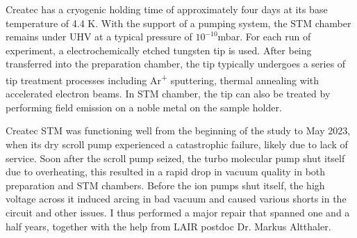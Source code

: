 Createc has a cryogenic holding time of approximately four days at its base temperature of 4.4 K. With the support of a pumping system, the STM chamber remains under UHV at a typical pressure of $10^{-10}$mbar. For each run of experiment, a electrochemically etched tungsten tip is used. After being transferred into the preparation chamber, the tip typically undergoes a series of tip treatment processes including Ar\textsuperscript{+} sputtering, thermal annealing with accelerated electron beams. In STM chamber, the tip can also be treated by performing field emission on a noble metal on the sample holder. 

Createc \ac{STM} was functioning well from the beginning of the study to May 2023, when its dry scroll pump experienced a catastrophic failure, likely due to lack of service. Soon after the scroll pump seized, the turbo molecular pump shut itself due to overheating, this resulted in a rapid drop in vacuum quality in both preparation and STM chambers. Before the ion pumps shut itself, the high voltage across it induced arcing in bad vacuum and caused various shorts in the circuit and other issues. I thus performed a major repair that spanned one and a half years, together with the help from LAIR postdoc Dr. Markus Altthaler. 
